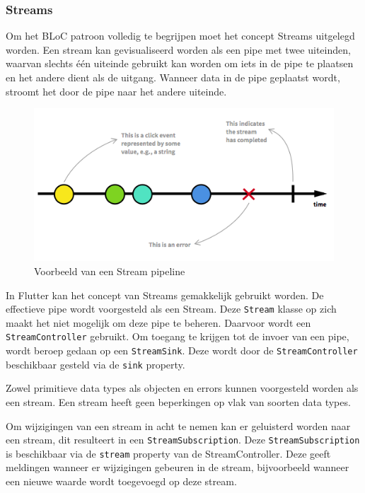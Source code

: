 \subsubsection{Streams}
Om het BLoC patroon volledig te begrijpen moet het concept Streams uitgelegd worden.
Een stream kan gevisualiseerd worden als een pipe met twee uiteinden, waarvan slechts
één uiteinde gebruikt kan worden om iets in de pipe te plaatsen en het andere dient als de uitgang. Wanneer data in de pipe
geplaatst wordt, stroomt het door de pipe naar het andere uiteinde. \autocite{Boelens2018}

\begin{figure}[H]
    \centering
    \includegraphics[width=\figureWidthModifier\linewidth]{img/stand-van-zaken/stream-pipeline.png}
    \caption{Voorbeeld van een Stream pipeline \autocite{Staltz2019}} 
    \label{fig:stream-pipeline}
\end{figure}

In Flutter kan het concept van Streams gemakkelijk gebruikt worden. De effectieve pipe wordt voorgesteld als een Stream. Deze \verb|Stream| klasse op zich maakt het niet mogelijk om deze pipe te beheren.
Daarvoor wordt een \verb|StreamController| gebruikt. Om toegang te krijgen tot de invoer van een pipe, wordt beroep gedaan op een \verb|StreamSink|. Deze wordt door de \verb|StreamController| beschikbaar gesteld via de \verb|sink| property.

Zowel primitieve data types als objecten en errors kunnen voorgesteld worden als een stream. Een stream heeft geen beperkingen op vlak van soorten data types.

Om wijzigingen van een stream in acht te nemen kan er geluisterd worden naar een stream, dit resulteert in een \verb|StreamSubscription|. Deze \verb|StreamSubscription| is beschikbaar via de \verb|stream| property van de StreamController. Deze geeft meldingen wanneer er wijzigingen gebeuren in de stream, bijvoorbeeld wanneer een nieuwe waarde wordt toegevoegd op deze stream.

